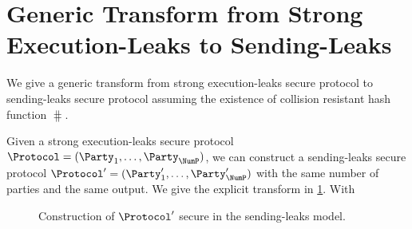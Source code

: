 \section{Generic Transform from Strong Execution-Leaks to Sending-Leaks}

We give a generic transform from strong execution-leaks secure protocol to sending-leaks secure protocol assuming the existence of collision resistant hash function $\hash$.

Given a strong execution-leaks secure protocol $\Protocol = (\Party_1, \ldots, \Party_\NumP)$, we can construct a sending-leaks secure protocol $\Protocol' = (\Party_1', \ldots, \Party_\NumP')$ with the same number of parties and the same output. We give the explicit transform in \cref{fig:strExe2send}. With 

\begin{figure}[ht!]%
	\centering%
	\nicoresetlinenr
	\caption{Construction of $\Protocol'$ secure in the sending-leaks model. }
	\label{fig:strExe2send}
\end{figure}